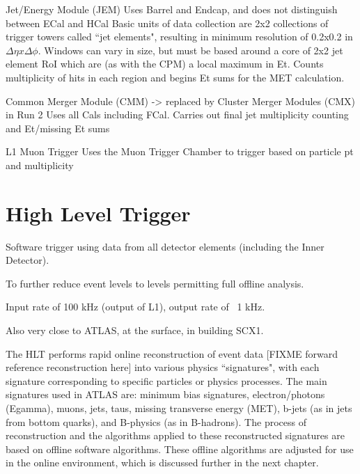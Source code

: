     Jet/Energy Module (JEM)
        Uses Barrel and Endcap, and does not distinguish between ECal and HCal
        Basic units of data collection are 2x2 collections of trigger towers called ``jet elements", resulting in minimum resolution of 0.2x0.2 in $\Delta \eta x \Delta \phi$.
        Windows can vary in size, but must be based around a core of 2x2 jet element RoI which are (as with the CPM) a local maximum in Et.
        Counts multiplicity of hits in each region and begins Et sums for the MET calculation.
        
    Common Merger Module (CMM) -> replaced by Cluster Merger Modules (CMX) in Run 2 \cite{trigger_run2}
        Uses all Cals including FCal.
        Carries out final jet multiplicity counting and Et/missing Et sums

L1 Muon Trigger \cite{trigger_run1}
    Uses the Muon Trigger Chamber %
    to trigger based on particle pt and multiplicity



\section{High Level Trigger}

Software trigger using data from all detector elements (including the Inner Detector).

To further reduce event levels to levels permitting full offline analysis.

Input rate of 100 kHz (output of L1), output rate of ~1 kHz.

Also very close to ATLAS, at the surface, in building SCX1. %

The HLT performs rapid online reconstruction of event data [FIXME forward reference reconstruction here] into various physics ``signatures", with each signature corresponding to specific particles or physics processes.
The main signatures used in ATLAS are: minimum bias signatures, electron/photons (Egamma), muons, jets, taus, missing transverse energy (MET), b-jets (as in jets from bottom quarks), and B-physics (as in B-hadrons).
The process of reconstruction and the algorithms applied to these reconstructed signatures are based on offline software algorithms.
These offline algorithms are adjusted for use in the online environment, which is discussed further in the next chapter.
    


